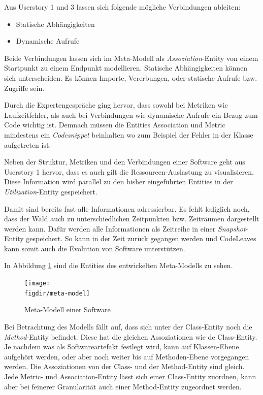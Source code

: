 Aus Userstory 1 und 3 lassen sich folgende mögliche Verbindungen ableiten:

\begin{itemize}
  \item Statische Abhängigkeiten
  \item Dynamische Aufrufe
\end{itemize}

Beide Verbindungen lassen sich im Meta-Modell als \textit{Assoziation}-Entity von einem Startpunkt zu einem Endpunkt modellieren. Statische Abhängigkeiten können sich unterscheiden. Es können Importe, Vererbungen, oder statische Aufrufe bzw. Zugriffe sein.

Durch die Expertengespräche ging hervor, dass sowohl bei Metriken wie Laufzeitfehler, als auch bei Verbindungen wie dynamische Aufrufe ein Bezug zum Code wichtig ist. Demnach müssen die Entities Association und Metric mindestens ein \textit{Codesnippet} beinhalten wo zum Beispiel der Fehler in der Klasse aufgetreten ist.


Neben der Struktur, Metriken und den Verbindungen einer Software geht aus Userstory 1 hervor, dass es auch gilt die Ressourcen-Auslastung zu visualisieren. Diese Information wird parallel zu den bisher eingeführten Entities in der \textit{Utilization}-Entity gespeichert.

Damit sind bereits fast alle Informationen adressierbar. Es fehlt lediglich noch, dass der Wald auch zu unterschiedlichen Zeitpunkten bzw. Zeiträumen dargestellt werden kann. Dafür werden alle Informationen als Zeitreihe in einer \textit{Snapshot}-Entity gespeichert. So kann in der Zeit zurück gegangen werden und CodeLeaves kann somit auch die Evolution von Software unterstützen.

In Abbildung \ref{fig:meta-model} sind die Entities des entwickelten Meta-Modells zu sehen.

\begin{figure}[htb]
  \texttt{[image: \\figdir/meta-model]}
  \caption{Meta-Modell einer Software}
  \label{fig:meta-model}
\end{figure}

Bei Betrachtung des Modells fällt auf, dass sich unter der Class-Entity noch die \textit{Method}-Entity befindet. Diese hat die gleichen Assoziationen wie de Class-Entity. Je nachdem was als Softwareartefakt festlegt wird, kann auf Klassen-Ebene aufgehört werden, oder aber noch weiter bis auf Methoden-Ebene vorgegangen werden. Die Assoziationen von der Class- und der Method-Entity sind gleich. Jede Metric- und Association-Entity lässt sich einer Class-Entity zuordnen, kann aber bei feinerer Granularität auch einer Method-Entity zugeordnet werden.

